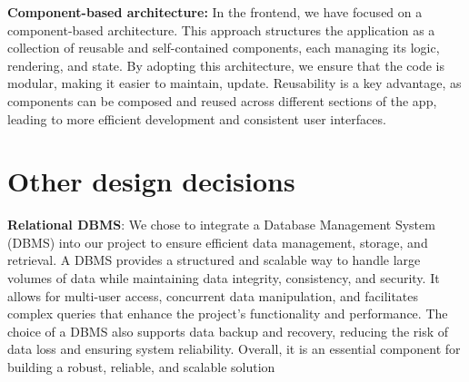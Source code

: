 \textbf{Component-based architecture:}
In the frontend, we have focused on a component-based architecture. This approach structures the application as a collection of reusable and self-contained components, each managing its logic, rendering, and state. By adopting this architecture, we ensure that the code is modular, making it easier to maintain, update. Reusability is a key advantage, as components can be composed and reused across different sections of the app, leading to more efficient development and consistent user interfaces.


\section{Other design decisions}

\textbf{Relational DBMS}: 
We chose to integrate a Database Management System (DBMS) into our project to ensure efficient data management, storage, and retrieval. A DBMS provides a structured and scalable way to handle large volumes of data while maintaining data integrity, consistency, and security. It allows for multi-user access, concurrent data manipulation, and facilitates complex queries that enhance the project's functionality and performance. The choice of a DBMS also supports data backup and recovery, reducing the risk of data loss and ensuring system reliability. Overall, it is an essential component for building a robust, reliable, and scalable solution
